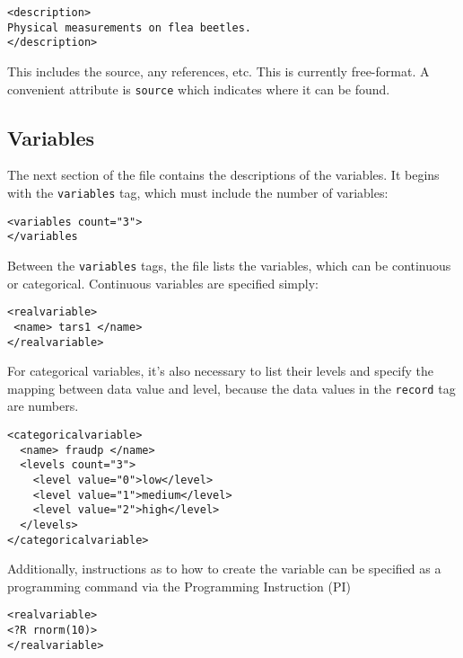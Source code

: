 \documentclass{article}
\begin{document}
\begin{verbatim}
<description>
Physical measurements on flea beetles.
</description>
\end{verbatim}

This includes the source, any references, etc.  This is currently
free-format.  A convenient attribute is \texttt{source} which
indicates where it can be found.

\subsection{Variables}

The next section of the file contains the descriptions of
the variables.  It begins with the \texttt{variables} tag,
which must include the number of variables:

\begin{verbatim}
<variables count="3">
</variables
\end{verbatim}
%
Between the \texttt{variables} tags, the file lists the variables,
which can be continuous or categorical.  Continuous variables are
specified simply:
\begin{verbatim}
<realvariable>
 <name> tars1 </name>
</realvariable>
\end{verbatim}
% 
For categorical variables, it's also necessary to list their
levels and specify the mapping between data value and level, because
the data values in the \texttt{record} tag are numbers.
\begin{verbatim}
<categoricalvariable>
  <name> fraudp </name>
  <levels count="3">
    <level value="0">low</level>
    <level value="1">medium</level>
    <level value="2">high</level>
  </levels>
</categoricalvariable>
\end{verbatim}




Additionally, instructions as to how to create the variable can be
specified as a programming command via the Programming Instruction (PI)
\begin{verbatim}
<realvariable>
<?R rnorm(10)>
</realvariable>
\end{verbatim}
\end{document}
